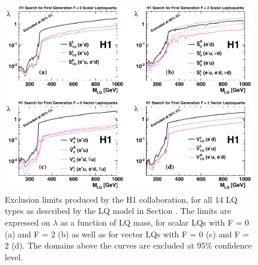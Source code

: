 \begin{figure}[!Hh]
       \centering
       \includegraphics[scale=0.45]{Figures/H1limits.png} 
       \caption[Observed limits on LQs produced by the H1 collaboration]{Exclusion limits produced by the H1 collaboration, for all 14 LQ types as described by the LQ model in Section \label{theoreticalconsiderations}.  The limits are expressed on $\lambda$ as a function of LQ mass, for scalar LQs with F = 0 (a) and F = 2 (b) as well as for vector LQs with F = 0 (c) and F = 2 (d).  The domains above the curves are excluded at 95\% confidence level.}
\label{figapp:H1limits}
\end{figure}
